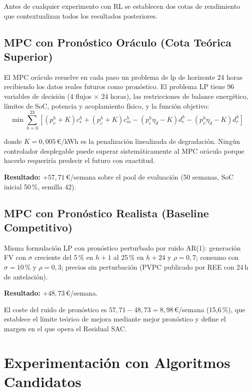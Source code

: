 \documentclass[12pt, a4paper, twoside]{report}
\begin{document}
Antes de cualquier experimento con RL se establecen dos cotas de rendimiento
que contextualizan todos los resultados posteriores.

\subsection{MPC con Pronóstico Oráculo (Cota Teórica Superior)}

El MPC oráculo resuelve en cada paso un problema de \acrshort{lp} de horizonte
24 horas recibiendo los datos reales futuros como pronóstico. El problema LP
tiene 96 variables de decisión (4 flujos $\times$ 24 horas), las restricciones
de balance energético, límites de SoC, potencia y acoplamiento físico, y la
función objetivo:
\begin{equation}
\min \sum_{h=0}^{23}\!\left[
  (p_v^h+K)c_s^h + (p_c^h+K)c_m^h
  - (p_c^h\eta_d-K)d_c^h - (p_v^h\eta_d-K)d_r^h
\right]
\label{eq:mpc_obj}
\end{equation}

donde $K = 0{,}005$\,€/kWh es la penalización linealizada de degradación.
Ningún controlador desplegable puede superar sistemáticamente al MPC oráculo
porque hacerlo requeriría predecir el futuro con exactitud.

\textbf{Resultado:} $+57{,}71$\,€/semana sobre el pool de
evaluación (50 semanas, SoC inicial 50\,\%, semilla 42).

\subsection{MPC con Pronóstico Realista (Baseline Competitivo)}

Misma formulación LP con pronóstico perturbado por ruido AR(1): generación FV
con $\sigma$ creciente del 5\,\% en $h{+}1$ al 25\,\% en $h{+}24$ y $\rho=0{,}7$;
consumo con $\sigma=10\,\%$ y $\rho=0{,}3$; precios sin perturbación (PVPC
publicado por REE con 24\,h de antelación).

\textbf{Resultado:} $+48{,}73$\,€/semana.

El coste del ruido de pronóstico es $57{,}71 - 48{,}73 = 8{,}98$\,€/semana
(15{,}6\,\%), que establece el límite teórico de mejora mediante mejor
pronóstico y define el margen en el que opera el Residual SAC.

\section{Experimentación con Algoritmos Candidatos}
\label{sec:candidatos}
\end{document}
